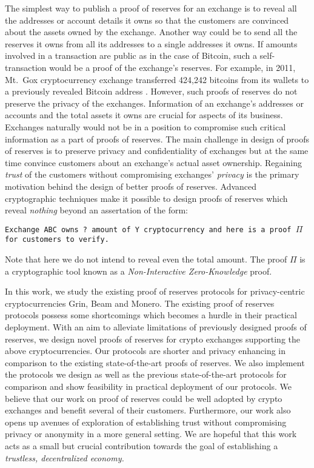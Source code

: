\begin{Abstract}
The simplest way to publish a proof of reserves for an exchange is to reveal all the addresses or account details it owns so that the customers are convinced about the assets owned by the exchange.
Another way could be to send all the reserves it owns from all its addresses to a single addresses it owns.
If amounts involved in a transaction are public as in the case of Bitcoin, such a self-transaction would be a proof of the exchange's reserves.
For example, in 2011, Mt.~Gox cryptocurrency exchange transferred 424,242 bitcoins from its wallets to a previously revealed Bitcoin address \cite{MtGoxWikipedia}.
However, such proofs of reserves do not preserve the privacy of the exchanges. 
Information of an exchange's addresses or accounts and the total assets it owns are crucial for aspects of its business.
Exchanges naturally would not be in a position to compromise such critical information as a part of proofs of reserves.
The main challenge in design of proofs of reserves is to preserve privacy and confidentiality of exchanges but at the same time convince customers about an exchange's actual asset ownership.
Regaining \textit{trust} of the customers without compromising exchanges' \textit{privacy} is the primary motivation behind the design of better proofs of reserves. 
Advanced cryptographic techniques make it possible to design proofs of reserves which reveal \textit{nothing} beyond an assertation of the form:
\begin{center}
    \texttt{Exchange ABC owns ? amount of Y cryptocurrency and here is a proof $\Pi$ for customers to verify.}
\end{center}
Note that here we do not intend to reveal even the total amount. 
The proof $\Pi$ is a cryptographic tool known as a \textit{Non-Interactive Zero-Knowledge} proof.

In this work, we study the existing proof of reserves protocols for privacy-centric cryptocurrencies Grin, Beam and Monero.
The existing proof of reserves protocols possess some shortcomings which becomes a hurdle in their practical deployment.
With an aim to alleviate limitations of previously designed proofs of reserves, we design novel proofs of reserves for crypto exchanges supporting the above cryptocurrencies.
Our protocols are shorter and privacy enhancing in comparison to the existing state-of-the-art proofs of reserves.
We also implement the protocols we design as well as the previous state-of-the-art protocols for comparison and show feasibility in practical deployment of our protocols.
We believe that our work on proof of reserves could be well adopted by crypto exchanges and benefit several of their customers.
Furthermore, our work also opens up avenues of exploration of establishing trust without compromising privacy or anonymity in a more general setting.
We are hopeful that this work acts as a small but crucial contribution towards the goal of establishing a \textit{trustless, decentralized economy.}
%
%
%
%
%
\end{Abstract}

